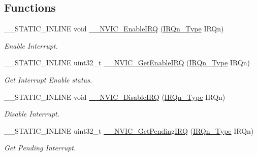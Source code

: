 \subsection*{Functions}
\begin{DoxyCompactItemize}
\item 
\+\_\+\+\_\+\+S\+T\+A\+T\+I\+C\+\_\+\+I\+N\+L\+I\+NE void \mbox{\hyperlink{group___c_m_s_i_s___core___n_v_i_c_functions_ga71227e1376cde11eda03fcb62f1b33ea}{\+\_\+\+\_\+\+N\+V\+I\+C\+\_\+\+Enable\+I\+RQ}} (\mbox{\hyperlink{group___configuration__section__for___c_m_s_i_s_ga7e1129cd8a196f4284d41db3e82ad5c8}{I\+R\+Qn\+\_\+\+Type}} I\+R\+Qn)
\begin{DoxyCompactList}\small\item\em Enable Interrupt. \end{DoxyCompactList}\item 
\+\_\+\+\_\+\+S\+T\+A\+T\+I\+C\+\_\+\+I\+N\+L\+I\+NE uint32\+\_\+t \mbox{\hyperlink{group___c_m_s_i_s___core___n_v_i_c_functions_gaaeb5e7cc0eaad4e2817272e7bf742083}{\+\_\+\+\_\+\+N\+V\+I\+C\+\_\+\+Get\+Enable\+I\+RQ}} (\mbox{\hyperlink{group___configuration__section__for___c_m_s_i_s_ga7e1129cd8a196f4284d41db3e82ad5c8}{I\+R\+Qn\+\_\+\+Type}} I\+R\+Qn)
\begin{DoxyCompactList}\small\item\em Get Interrupt Enable status. \end{DoxyCompactList}\item 
\+\_\+\+\_\+\+S\+T\+A\+T\+I\+C\+\_\+\+I\+N\+L\+I\+NE void \mbox{\hyperlink{group___c_m_s_i_s___core___n_v_i_c_functions_gae016e4c1986312044ee768806537d52f}{\+\_\+\+\_\+\+N\+V\+I\+C\+\_\+\+Disable\+I\+RQ}} (\mbox{\hyperlink{group___configuration__section__for___c_m_s_i_s_ga7e1129cd8a196f4284d41db3e82ad5c8}{I\+R\+Qn\+\_\+\+Type}} I\+R\+Qn)
\begin{DoxyCompactList}\small\item\em Disable Interrupt. \end{DoxyCompactList}\item 
\+\_\+\+\_\+\+S\+T\+A\+T\+I\+C\+\_\+\+I\+N\+L\+I\+NE uint32\+\_\+t \mbox{\hyperlink{group___c_m_s_i_s___core___n_v_i_c_functions_ga5a92ca5fa801ad7adb92be7257ab9694}{\+\_\+\+\_\+\+N\+V\+I\+C\+\_\+\+Get\+Pending\+I\+RQ}} (\mbox{\hyperlink{group___configuration__section__for___c_m_s_i_s_ga7e1129cd8a196f4284d41db3e82ad5c8}{I\+R\+Qn\+\_\+\+Type}} I\+R\+Qn)
\begin{DoxyCompactList}\small\item\em Get Pending Interrupt. \end{DoxyCompactList}\item 

\end{DoxyCompactItemize}
